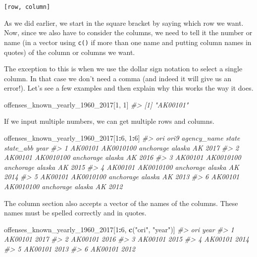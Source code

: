 \documentclass[
  12pt,
]{book}
\newenvironment{Shaded}{\begin{snugshade}}{\end{snugshade}}
\newcommand{\CommentTok}[1]{\textcolor[rgb]{0.37,0.37,0.37}{\textit{#1}}}
\newcommand{\DecValTok}[1]{\textcolor[rgb]{0.06,0.06,0.06}{#1}}
\newcommand{\KeywordTok}[1]{\textcolor[rgb]{0.27,0.27,0.27}{\textbf{#1}}}
\newcommand{\NormalTok}[1]{#1}
\newcommand{\OperatorTok}[1]{\textcolor[rgb]{0.43,0.43,0.43}{\textbf{#1}}}
\newcommand{\StringTok}[1]{\textcolor[rgb]{0.5,0.5,0.5}{#1}}
\begin{document}
\texttt{{[}row,\ column{]}}

As we did earlier, we start in the square bracket by saying which row we want. Now, since we also have to consider the columns, we need to tell it the number or name (in a vector using \texttt{c()} if more than one name and putting column names in quotes) of the column or columns we want.

The exception to this is when we use the dollar sign notation to select a single column. In that case we don't need a comma (and indeed it will give us an error!). Let's see a few examples and then explain why this works the way it does.

\begin{Shaded}
\begin{Highlighting}[]
\NormalTok{offenses\_known\_yearly\_}\DecValTok{1960}\NormalTok{\_}\DecValTok{2017}\NormalTok{[}\DecValTok{1}\NormalTok{, }\DecValTok{1}\NormalTok{]}
\CommentTok{\#> [1] "AK00101"}
\end{Highlighting}
\end{Shaded}

If we input multiple numbers, we can get multiple rows and columns.

\begin{Shaded}
\begin{Highlighting}[]
\NormalTok{offenses\_known\_yearly\_}\DecValTok{1960}\NormalTok{\_}\DecValTok{2017}\NormalTok{[}\DecValTok{1}\OperatorTok{:}\DecValTok{6}\NormalTok{, }\DecValTok{1}\OperatorTok{:}\DecValTok{6}\NormalTok{]}
\CommentTok{\#>       ori      ori9 agency\_name  state state\_abb year}
\CommentTok{\#> 1 AK00101 AK0010100   anchorage alaska        AK 2017}
\CommentTok{\#> 2 AK00101 AK0010100   anchorage alaska        AK 2016}
\CommentTok{\#> 3 AK00101 AK0010100   anchorage alaska        AK 2015}
\CommentTok{\#> 4 AK00101 AK0010100   anchorage alaska        AK 2014}
\CommentTok{\#> 5 AK00101 AK0010100   anchorage alaska        AK 2013}
\CommentTok{\#> 6 AK00101 AK0010100   anchorage alaska        AK 2012}
\end{Highlighting}
\end{Shaded}

The column section also accepts a vector of the names of the columns. These names must be spelled correctly and in quotes.

\begin{Shaded}
\begin{Highlighting}[]
\NormalTok{offenses\_known\_yearly\_}\DecValTok{1960}\NormalTok{\_}\DecValTok{2017}\NormalTok{[}\DecValTok{1}\OperatorTok{:}\DecValTok{6}\NormalTok{, }\KeywordTok{c}\NormalTok{(}\StringTok{"ori"}\NormalTok{, }\StringTok{"year"}\NormalTok{)]}
\CommentTok{\#>       ori year}
\CommentTok{\#> 1 AK00101 2017}
\CommentTok{\#> 2 AK00101 2016}
\CommentTok{\#> 3 AK00101 2015}
\CommentTok{\#> 4 AK00101 2014}
\CommentTok{\#> 5 AK00101 2013}
\CommentTok{\#> 6 AK00101 2012}
\end{Highlighting}
\end{Shaded}
\end{document}
